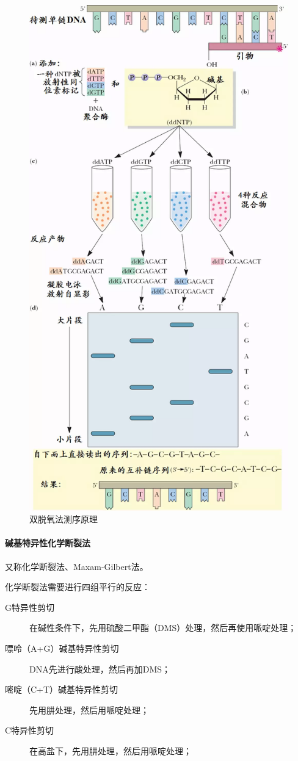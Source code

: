 \begin{figure}[p]
	\centering
	\includegraphics[width=0.7\linewidth]{Pics/Sanger法DNA测序}
	\caption{双脱氧法测序原理}
	\label{fig:sanger_dna}
\end{figure}

\paragraph{碱基特异性化学断裂法}

又称化学断裂法、Maxam-Gilbert法。

化学断裂法需要进行四组平行的反应：

\begin{description}
	\item[G特异性剪切] 在碱性条件下，先用硫酸二甲酯（DMS）处理，然后再使用哌啶处理；
	\item[嘌呤（A+G）碱基特异性剪切] DNA先进行酸处理，然后再加DMS；
	\item[嘧啶（C+T）碱基特异性剪切] 先用肼处理，然后用哌啶处理；
	\item[C特异性剪切] 在高盐下，先用肼处理，然后用哌啶处理；
\end{description}

